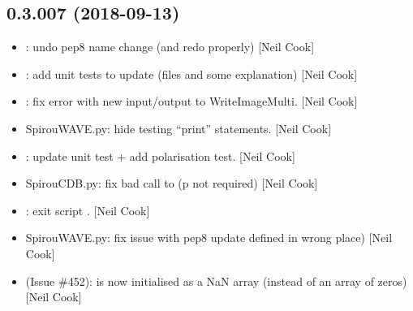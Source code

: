 \documentclass[a4paper,10pt,english]{report}
\begin{document}
\subsection{0.3.007 (2018-09-13)}
\label{\detokenize{misc/changelog:id327}}\begin{itemize}
\item {} 
: undo pep8 name change (and redo properly) {[}Neil
Cook{]}

\item {} 
: add unit tests to update (files and some
explanation) {[}Neil Cook{]}

\item {} 
: fix error with new input/output to WriteImageMulti.
{[}Neil Cook{]}

\item {} 
SpirouWAVE.py: hide testing “print” statements. {[}Neil Cook{]}

\item {} 
: update unit test + add polarisation test. {[}Neil Cook{]}

\item {} 
SpirouCDB.py: fix bad call to  (p not required) {[}Neil
Cook{]}

\item {} 
: exit script . {[}Neil Cook{]}

\item {} 
SpirouWAVE.py: fix issue with pep8 update  defined in wrong
place) {[}Neil Cook{]}

\item {} 
 (Issue \#452):  is now initialised as a NaN
array (instead of an array of zeros) {[}Neil Cook{]}

\end{itemize}
\end{document}
